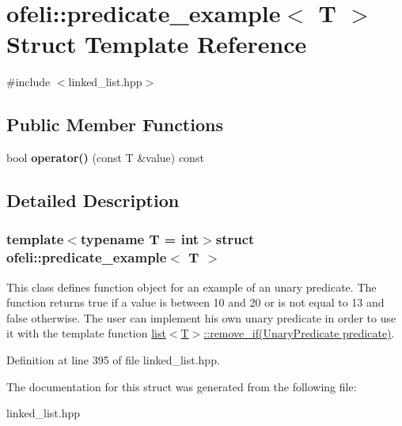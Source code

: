 \hypertarget{structofeli_1_1predicate__example}{\section{ofeli\-:\-:predicate\-\_\-example$<$ T $>$ Struct Template Reference}
\label{structofeli_1_1predicate__example}
}


{\ttfamily \#include $<$linked\-\_\-list.\-hpp$>$}

\subsection*{Public Member Functions}
\begin{DoxyCompactItemize}
\item 
\hypertarget{structofeli_1_1predicate__example_a4369d6176a1d0f327851ee19986f4065}{bool {\bfseries operator()} (const T \&value) const }\label{structofeli_1_1predicate__example_a4369d6176a1d0f327851ee19986f4065}

\end{DoxyCompactItemize}


\subsection{Detailed Description}
\subsubsection*{template$<$typename T = int$>$struct ofeli\-::predicate\-\_\-example$<$ T $>$}

This class defines function object for an example of an unary predicate. The function returns {\ttfamily true} if a value is between 10 and 20 or is not equal to 13 and {\ttfamily false} otherwise. The user can implement his own unary predicate in order to use it with the template function {\ttfamily \hyperlink{classofeli_1_1list_a2982d8f3bf7593929fe6ea3a7ad03fc6}{list$<$\-T$>$\-::remove\-\_\-if(\-Unary\-Predicate predicate)}}. 

Definition at line 395 of file linked\-\_\-list.\-hpp.



The documentation for this struct was generated from the following file\-:\begin{DoxyCompactItemize}
\item 
linked\-\_\-list.\-hpp\end{DoxyCompactItemize}
